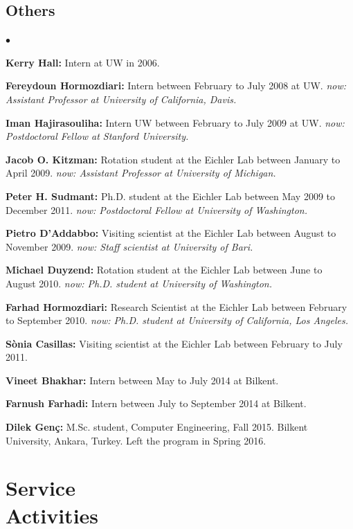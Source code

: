 \documentclass[margin,line]{res}
\newenvironment{list2}{
  \begin{list}{$\bullet$}{%
      \setlength{\itemsep}{0in}
      \setlength{\parsep}{0in} \setlength{\parskip}{0in}
      \setlength{\topsep}{0in} \setlength{\partopsep}{0in} 
      \setlength{\leftmargin}{0.2in}}}{\end{list}}
\begin{document}
\begin{resume}
\subsection{\small \sc Others}
\begin{list2}
\item
{\bf Kerry Hall:} Intern at UW in 2006. 
\item
{\bf Fereydoun Hormozdiari:} Intern between February to July 2008 at UW. 
{\it now: Assistant Professor at University of California, Davis.}
\item
{\bf Iman Hajirasouliha:}  Intern UW between February to July 2009 at UW.
{\it now: Postdoctoral Fellow at Stanford University.}
\item
{\bf Jacob O. Kitzman:} Rotation student at the Eichler Lab between January to April 2009.
{\it now: Assistant Professor at University of Michigan.}
\item
{\bf Peter H. Sudmant:} Ph.D. student at the Eichler Lab between May 2009 to December 2011.
{\it now: Postdoctoral Fellow at University of Washington.}
\item
{\bf Pietro D'Addabbo:} Visiting scientist at the Eichler Lab between August to November 2009.
{\it now: Staff scientist at University of Bari.}
\item
{\bf Michael Duyzend:} Rotation student at the Eichler Lab between June to August 2010.
{\it now: Ph.D. student at University of Washington.}
\item
{\bf Farhad Hormozdiari:} Research Scientist at the Eichler Lab between February to September 2010.
{\it now: Ph.D. student at University of California, Los Angeles.}
\item
{\bf S\`{o}nia Casillas:} Visiting scientist at the Eichler Lab between February to July 2011.
\item
{\bf Vineet Bhakhar:} Intern between May to July 2014 at Bilkent. 
\item
{\bf Farnush Farhadi:} Intern between July to September 2014 at Bilkent. 
\item
  {\bf Dilek Genç:} M.Sc. student, Computer Engineering, Fall 2015.
  Bilkent University, Ankara, Turkey. Left the program in Spring 2016. 
\end{list2}

\vspace*{-.2cm}
\section{\sc Service \\ Activities}
\vspace{-0.3cm}

\end{resume}
\end{document}

